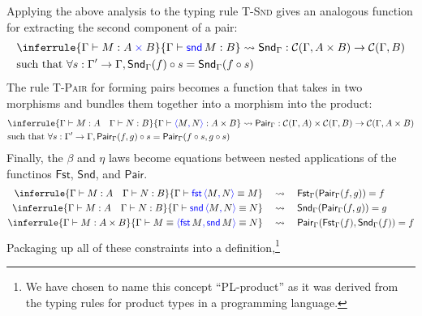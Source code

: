 Applying the above analysis to the typing rule \textsc{T-Snd}
gives an analogous function for extracting the second component of a pair:
\begin{align*}
  &\inferrule
    {\Gamma \vdash M : A \pltimes B}
    {\Gamma \vdash \plsnd{M} : B}
    \rightsquigarrow
    \mathsf{Snd}_\Gamma : \calC(\Gamma, A \times B) \to \calC(\Gamma, B)
    \\
  &\text{such that }\forall s : \Gamma' \to \Gamma,
    \mathsf{Snd}_\Gamma(f)\circ s = \mathsf{Snd}_\Gamma(f \circ s)
\end{align*}
The rule \textsc{T-Pair} for forming pairs becomes a function
that takes in two morphisms and bundles them together into a morphism into the product:
\begin{align*}
  &\inferrule
    {\Gamma \vdash M : A \quad
      \Gamma \vdash N : B }
    {\Gamma \vdash \plpair{M}{N} : A \times B}
    \rightsquigarrow
    \mathsf{Pair}_\Gamma : \calC(\Gamma, A) \times \calC(\Gamma, B) 
    \to \calC(\Gamma, A \times B)
\\
   &\text{such that }\forall s : \Gamma' \to \Gamma,
    \mathsf{Pair}_\Gamma(f, g)\circ s = \mathsf{Pair}_\Gamma(f \circ s, g \circ s)
\end{align*}
Finally, the $\beta$ and $\eta$ laws become equations between nested applications of the functinos \(\mathsf{Fst}\), \(\mathsf{Snd}\),
and \(\mathsf{Pair}\).
\begin{align*}
  \inferrule
    {\Gamma \vdash M : A \quad
      \Gamma \vdash N : B }
    {\Gamma \vdash \plfst{\plpair{M}{N}} \equiv M}
    &\quad\rightsquigarrow\quad
    \mathsf{Fst}_\Gamma(\mathsf{Pair}_\Gamma(f,g)) = f
\\
  \inferrule
    {\Gamma \vdash M : A \quad
      \Gamma \vdash N : B }
    {\Gamma \vdash \plsnd{\plpair{M}{N}} \equiv N}
    &\quad\rightsquigarrow\quad
    \mathsf{Snd}_\Gamma(\mathsf{Pair}_\Gamma(f,g)) = g
\\
  \inferrule
    {\Gamma \vdash M : A \times B}
    {\Gamma \vdash M \equiv \plpair{\plfst{M}}{\plsnd{M}} \equiv N}
    &\quad\rightsquigarrow\quad
    \mathsf{Pair}_\Gamma(\mathsf{Fst}_\Gamma(f), \mathsf{Snd}_\Gamma(f)) = f
\end{align*}
Packaging up all of these constraints into a definition,\footnote{We have chosen to name this concept ``PL-product'' as it was derived from the typing rules for product types in a programming language.}
